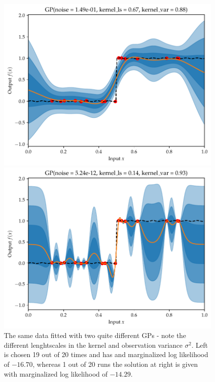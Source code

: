 \begin{figure}[H]
    \centering
    \begin{minipage}[b]{0.49\textwidth}
     \includegraphics[width=\textwidth]{Pictures/GP_vs_BNN1.pdf}
    \end{minipage}
    \hfill
    \begin{minipage}[b]{0.49\textwidth}
      \includegraphics[width=\textwidth]{Pictures/GP_vs_BNN1_b.pdf}
     \end{minipage}
     \caption{The same data fitted with two quite different GPs - note the different lenghtscales in the
     kernel and observation variance $\sigma^2$. Left is chosen 19 out of 20 times and has and marginalized log likelihood of $-16.70$,
     whereas 1 out of 20 runs the solution at right is given with marginalized log likelihood of
     $-14.29$.}
     \label{GP_two_results}
\end{figure}
